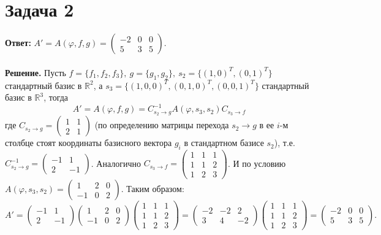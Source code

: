 \documentclass{article}
\begin{document}
\section*{Задача 2}
{\bf Ответ:} $A'=A(\varphi, f, g)=\left(\begin{array}{rrr}-2 & 0 & 0\\5 & 3 & 5\end{array}\right)$.
\\
\\
{\bf Решение.} Пусть $f=\{f_1, f_2, f_3\},\ g=\{g_1,g_2\},\ s_2 = \{(1,0)^T, (0,1)^T\}$ стандартный базис в $\mathbb{R}^2$, а $s_3 = \{(1,0,0)^T,(0,1,0)^T,(0,0,1)^T\}$ стандартный базис в $\mathbb{R}^3$, тогда
$$A'=A(\varphi,  f, g)=C^{-1}_{s_2\rightarrow g}A(\varphi, s_3, s_2)C_{s_3\rightarrow f}$$
где $C_{s_2\rightarrow g}=\left(\begin{array}{rr}1 & 1\\2 & 1\end{array}\right)$ (по определению матрицы перехода $s_2\rightarrow g$ в ее $i$-м столбце стоят координаты базисного вектора $g_i$ в стандартном базисе $s_2$), т.е. $C^{-1}_{s_2\rightarrow g}=\left(\begin{array}{rr}-1 & 1\\2 & -1\end{array}\right)$. Аналогично $C_{s_3\rightarrow f}=\left(\begin{array}{rrr}1 & 1 & 1\\1 & 1 & 2\\1 & 2 & 3\end{array}\right)$. И по условию $A(\varphi, s_3, s_2)=\left(\begin{array}{rrr}1 & 2 & 0\\-1 & 0 & 2\end{array}\right)$. Таким образом:
$$A'=\left(\begin{array}{rr}-1 & 1\\2 & -1\end{array}\right)\left(\begin{array}{rrr}1 & 2 & 0\\-1 & 0 & 2\end{array}\right)\left(\begin{array}{rrr}1 & 1 & 1\\1 & 1 & 2\\1 & 2 & 3\end{array}\right)=\left(\begin{array}{rrr}-2 & -2 & 2\\3 & 4 & -2\end{array}\right)\left(\begin{array}{rrr}1 & 1 & 1\\1 & 1 & 2\\1 & 2 & 3\end{array}\right)=\left(\begin{array}{rrr}-2 & 0 & 0\\5 & 3 & 5\end{array}\right).$$
\end{document}
